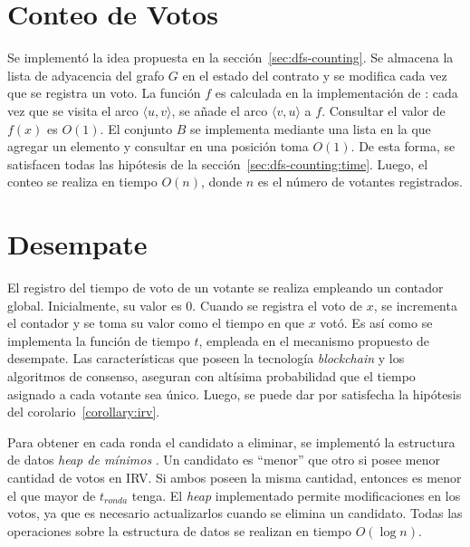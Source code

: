 \section{Conteo de Votos}
Se implement\'o la idea propuesta en la secci\'on~\ref{sec:dfs-counting}. Se almacena la lista de adyacencia del grafo $G$ en el estado del contrato y se modifica cada vez que se registra un voto. La funci\'on $f$ es calculada en la implementaci\'on de \dfsvisitcaption: cada vez que se visita el arco $\langle u, v \rangle$, se a\~nade el arco $\langle v, u \rangle$ a $f$. Consultar el valor de $f(x)$ es $O(1)$. El conjunto $B$ se implementa mediante una lista en la que agregar un elemento y consultar en una posici\'on toma $O(1)$. De esta forma, se satisfacen todas las hip\'otesis de la secci\'on~\ref{sec:dfs-counting:time}. Luego, el conteo se realiza en tiempo $O(n)$, donde $n$ es el n\'umero de votantes registrados.

\section{Desempate}
El registro del tiempo de voto de un votante se realiza empleando un contador global. Inicialmente, su valor es $0$. Cuando se registra el voto de $x$, se incrementa el contador y se toma su valor como el tiempo en que $x$ vot\'o. Es as\'i como se implementa la funci\'on de tiempo $t$, empleada en el mecanismo propuesto de desempate. Las caracter\'isticas que  poseen la tecnolog\'ia \textit{blockchain}  y los algoritmos de consenso, aseguran con alt\'isima probabilidad que el tiempo asignado a cada votante sea \'unico.  Luego, se puede dar por satisfecha la hip\'otesis del corolario~\ref{corollary:irv}.

Para obtener en cada ronda el candidato a eliminar, se implement\'o la estructura de datos \textit{heap de m\'inimos} \citep{intro-to-algo-3}. Un candidato es ``menor'' que otro si posee menor cantidad de votos en IRV. Si ambos poseen la misma cantidad, entonces es menor el que mayor de $t_{ronda}$ tenga. El \textit{heap} implementado permite modificaciones en los votos, ya que es necesario actualizarlos cuando se elimina un candidato. Todas las operaciones sobre la estructura de datos se realizan en tiempo $O(\log n)$.

